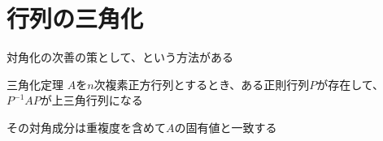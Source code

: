 \documentclass[../../../topic_linear-algebra]{subfiles}
\begin{document}
\sectionline
\section{行列の三角化}

対角化の次善の策として、という方法がある

\begin{theorem}{三角化定理}\label{thm:triangularization-theorem}
  $A$を$n$次複素正方行列とするとき、ある正則行列$P$が存在して、$P^{-1}AP$が上三角行列になる

  その対角成分は重複度を含めて$A$の固有値と一致する
\end{theorem}
\end{document}
